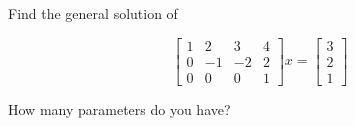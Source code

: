 \item[3.8] Find the general solution of

\begin{equation*}
 \begin{bmatrix}
  1 & 2 & 3 & 4\\
  0 & -1 & -2 & 2\\
  0 & 0 & 0 & 1
 \end{bmatrix}
x=
\begin{bmatrix}
 3\\
 2\\
 1
\end{bmatrix}
\end{equation*}

How many parameters do you have?
